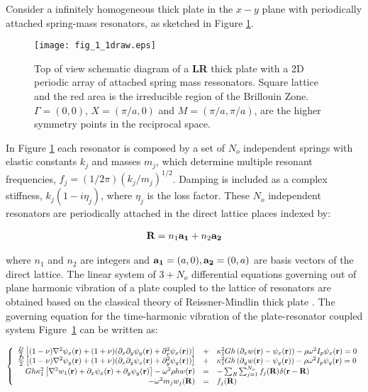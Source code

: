 \documentclass[a4paper]{ICEDyn}
\begin{document}
	Consider a infinitely homogeneous thick plate in the $x-y$ plane with periodically attached spring-mass resonators, as sketched in Figure \ref{fig:1}.	
	\begin{figure}[!htb]
		\texttt{[image: fig\_1\_1draw.eps]}
		\caption{Top of view schematic diagram of a {\bf LR} thick plate with a 2D periodic array of attached spring mass ressonators. Square lattice and the red area is the irreducible region of the Brillouin Zone. $\Gamma = (0,0)$, $X=(\pi/a,0)$ and $M=(\pi/a,\pi/a)$, are the higher symmetry points in the reciprocal space.}
         \label{fig:1}
	\end{figure}
    
	In Figure \ref{fig:1} each resonator is composed by a set of $N_o$ independent springs with elastic constants $k_j$ and masses $m_j$, which determine multiple resonant frequencies, $f_j = (1/2\pi)(k_j/m_j)^{1/2}$. Damping is included as a complex stiffness, $ k_{j}(1-i\eta_{j}) $, where $ \eta_{j} $ is the loss factor. These $N_o$ independent resonators are periodically attached in the direct lattice places indexed by:
	
	\begin{eqnarray}\label{dir_latt}
	{\bf R} = n_1{\bf a_1}+n_2{\bf a_2}\nonumber
	\end{eqnarray}
	
	where $n_1$ and $n_2$ are integers  and ${\bf a_1 }= (a,0), {\bf a_2}=(0,a)$ are basis vectors of the direct lattice. The linear system of $3+N_o$ differential equations governing out of plane harmonic vibration of a plate coupled to the lattice of resonators are obtained based on the classical theory of Reissner-Mindlin thick plate \cite{Szilard}. The governing equation for the time-harmonic vibration of the plate-resonator coupled system Figure~\ref{fig:1} can be written as:
     	
	\begin{equation}\label{eq:1}
	\left \{
	\begin{array}{r c l}
	\frac{D}{2}\left[ (1-\nu)\nabla^2\psi_x({\bf r}) + (1+\nu)(\partial_x \partial_y\psi_y({\bf r})+\partial_x^2\psi_x({\bf r}))\right ]&+&\kappa_{1}^{2}Gh\left( \partial_x w({\bf r})-\psi_x({\bf r}) \right)-\rho\omega^2 I_p \psi_x({\bf r})
	=  0 \\
	\frac{D}{2}\left[(1-\nu) \nabla^2\psi_y({\bf r}) + (1+\nu)(\partial_x\partial_y \psi_x({\bf r}) + \partial_y^2\psi_y({\bf r}))\right ] &+&\kappa_{1}^{2}Gh\left(\partial_y w({\bf r})-\psi_y({\bf r}) \right)-\rho\omega^2 I_p \psi_y({\bf r}) = 0\\
	Gh\kappa_{1}^{2}\left [\nabla^2 w_1({\bf r}) + \partial_x\psi_x({\bf r}) +\partial_y\psi_y({\bf r}) \right ]-\omega^2\rho h  w({\bf r})& = & - \sum_{{R}}\sum_{j=1}^{N_o} f_{j}({ \bf R})\delta({ \bf r}-{ \bf R})\\
	-\omega^2 m_j w_j({\bf R}) &=& f_j({\bf R})
	\end{array}
	\right .
	\end{equation}
	
\end{document}
